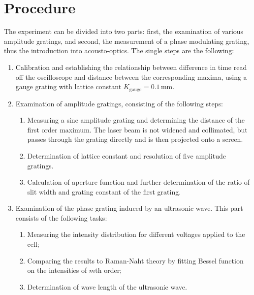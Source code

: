 \section{Procedure}
The experiment can be divided into two parts: first, the examination of various 
amplitude gratings, and second, the measurement of a phase modulating grating, 
thus the introduction into acousto-optics. The single steps are the following:
\begin{enumerate}
    \item
        Calibration and establishing the relationship between difference in time 
        read off the oscilloscope and distance between the corresponding maxima, 
        using a gauge grating with lattice constant $K_\mathrm{gauge} = 0.1 \,$mm.
    \item
        Examination of amplitude gratings, consisting of the following steps:
        \begin{enumerate}
            \item
                Measuring a sine amplitude grating and determining the distance of the first 
                order maximum. The laser beam is not widened and collimated, but 
                passes through the grating directly and is then projected onto a screen. 
            \item
                Determination of lattice constant and resolution of five amplitude gratings.
            \item
                Calculation of aperture function and further 
                determination of the ratio of slit width and grating constant of the first grating. 
        \end{enumerate}
        \item
            Examination of the phase grating induced by an ultrasonic wave. 
            This part consists of the following tasks:
        \begin{enumerate}
            \item
                Measuring the intensity distribution for different voltages applied to the cell;
            \item
                Comparing the results to Raman-Naht theory by fitting Bessel function on the 
                intensities of $m$th order;
            \item
                Determination of wave length of the ultrasonic wave.
        \end{enumerate}
\end{enumerate}

